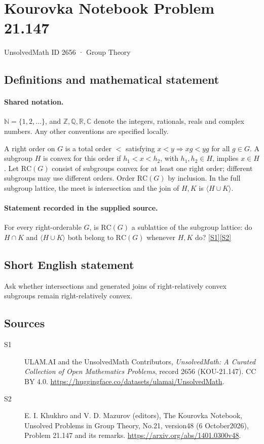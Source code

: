 \documentclass[11pt]{article}
\newcommand{\sref}[2]{\hyperlink{source:#1:#2}{[S#2]}}
\begin{document}
\setcounter{section}{2655}
\section{Kourovka Notebook Problem 21.147}\label{2656}
{\small\sffamily UnsolvedMath ID 2656 · Group Theory}
\subsection{Definitions and mathematical statement}

\paragraph{Shared notation.}$\mathbb N=\{1,2,\ldots\}$, and $\mathbb Z,\mathbb Q,\mathbb R,\mathbb C$ denote the integers, rationals, reals and complex numbers. Any other conventions are specified locally.


A right order on $G$ is a total order $<$ satisfying $x<y\Rightarrow xg<yg$ for all $g\in G$. A subgroup $H$ is convex for this order if $h_1<x<h_2$, with $h_1,h_2\in H$, implies $x\in H$. Let $\mathrm{RC}(G)$ consist of subgroups convex for at least one right order; different subgroups may use different orders. Order $\mathrm{RC}(G)$ by inclusion. In the full subgroup lattice, the meet is intersection and the join of $H,K$ is $\langle H\cup K\rangle$.
\paragraph{Statement recorded in the supplied source.}
For every right-orderable $G$, is $\mathrm{RC}(G)$ a sublattice of the subgroup lattice: do $H\cap K$ and $\langle H\cup K\rangle$ both belong to $\mathrm{RC}(G)$ whenever $H,K$ do? \sref{2656}{1}\sref{2656}{2}
\subsection{Short English statement}
Ask whether intersections and generated joins of right-relatively convex subgroups remain right-relatively convex.
\subsection{Sources}
\begin{description}
\item[\hypertarget{source:2656:1}{S1}] ULAM.AI and the UnsolvedMath Contributors, \emph{UnsolvedMath: A Curated Collection of Open Mathematics Problems}, record 2656 (KOU-21.147). CC BY 4.0. \url{https://huggingface.co/datasets/ulamai/UnsolvedMath}.
\item[\hypertarget{source:2656:2}{S2}] E. I. Khukhro and V. D. Mazurov (editors), The Kourovka Notebook, Unsolved Problems in Group Theory, No.21, version48 (6 October2026), Problem 21.147 and its remarks. \url{https://arxiv.org/abs/1401.0300v48}.
\end{description}
\label{end:2656}
\end{document}
